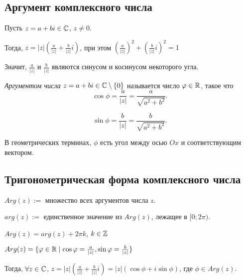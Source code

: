 \subsection{Аргумент комплексного числа}

Пусть $z = a + bi \in \mathbb{C}$, $z \neq 0$.

Тогда, $z = |z| \left(\frac{a}{|z|} + \frac{b}{|z|}i\right)$, при этом $\left(\frac{a}{|z|}\right)^2 + \left(\frac{b}{|z|}i\right)^2 = 1$

Значит, $\frac{a}{|z|}$ и $\frac{b}{|z|}$ являются синусом и косинусом некоторого угла.

\begin{definition}
    \textit{Аргументом числа} $z = a + bi \in \mathbb{C} \setminus \{0\}$ называется число $\varphi \in \mathbb{R}$, такое что
    \begin{equation*}
        \cos \phi = \frac{a}{|z|} = \frac{a} {\sqrt{a^2 + b^2}}
    .\end{equation*}

    \begin{equation*}
        \sin \phi = \frac{b}{|z|} = \frac{b}{\sqrt{a^2 + b^2}}
    .\end{equation*}

    В геометрических терминах, $\phi$ есть угол между осью $Ox$ и соответствующим вектором.
\end{definition}

\begin{comment}
    При $z \neq 0$, аргумент определен с точностью до $2 \pi k$, $k \in \ZZ$.
\end{comment}

\begin{comment}
    При $z = 0$, удобно считать что любое $\phi$ является аргументом.
\end{comment}


\subsection{Тригонометрическая форма комплексного числа}

$Arg(z) :=$ множество всех аргументов числа $z$.

$arg(z) :=$ единственное значение из $Arg(z)$, лежащее в $[0; 2 \pi)$.

$Arg(z) = arg(z) + 2 \pi k$, $k \in \mathbb{Z}$

$Arg(z) = \{\varphi \in \mathbb{R} \mid \cos \varphi = \frac{a}{|z|}, \sin \varphi = \frac{b}{|z|}\}$

Тогда, $\forall z \in \mathbb{C}$, $z = |z| \left(\frac{a}{|z|} + \frac{b}{|z|} i\right) = |z| \left(\cos \phi + i \sin \phi\right)$, где $\phi \in Arg(z)$.

